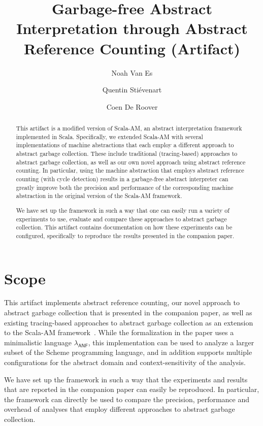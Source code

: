 \documentclass[a4paper,UKenglish]{darts-v2019}
\title{Garbage-free Abstract Interpretation through Abstract Reference Counting (Artifact)} %
\author{Noah Van Es}{Software Languages Lab, Vrije Universiteit Brussel, Belgium}{noah.van.es@vub.be}{}{Funded by a PhD Fellowship of the Research Foundation - Flanders (FWO)}
\author{Quentin Sti\'evenart}{Software Languages Lab, Vrije Universiteit Brussel, Belgium}{quentin.stievenart@vub.be}{}{}
\author{Coen De Roover}{Software Languages Lab, Vrije Universiteit Brussel, Belgium}{coen.de.roover@vub.be}{}{}
\newenvironment{scope}{\section{Scope}}{}
\begin{document}
\maketitle

\begin{abstract}
This artifact is a modified version of Scala-AM, an abstract interpretation framework implemented in Scala. 
Specifically, we extended Scala-AM with several implementations of machine abstractions that each employ a different approach to abstract garbage collection. 
These include traditional (tracing-based) approaches to abstract garbage collection, as well as our own novel approach using abstract reference counting. In particular, using the machine abstraction that employs abstract reference counting (with cycle detection) results in a garbage-free abstract interpreter can greatly improve both the precision and performance of the corresponding machine abstraction in the original version of the Scala-AM framework.

We have set up the framework in such a way that one can easily run a variety of experiments to use, evaluate and compare these approaches to abstract garbage collection. This artifact contains documentation on how these experiments can be configured, specifically to reproduce the results presented in the companion paper.
 \end{abstract}


\begin{scope}
This artifact implements abstract reference counting, our novel approach to abstract garbage collection that is presented in the companion paper, as well as existing tracing-based approaches to abstract garbage collection as an extension to the Scala-AM framework~\cite{stievenart2016building,stievenart2016scala}. 
While the formalization in the paper uses a minimalistic language $\lambda_{\textsf{ANF}}$, this implementation can be used to analyze a larger subset of the Scheme programming language, and in addition supports multiple configurations for the abstract domain and context-sensitivity of the analysis.

We have set up the framework in such a way that the experiments and results that are reported in the companion paper can easily be reproduced.
In particular, the framework can directly be used to compare the precision, performance and overhead of analyses that employ different approaches to abstract garbage collection.

\end{scope}
\end{document}
